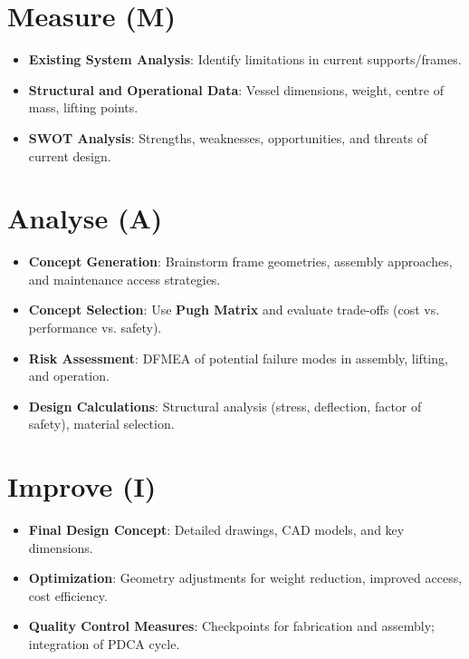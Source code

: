 \documentclass[9pt]{extarticle}
\begin{document}
\newpage

\section{Measure (M)}
\color{red!50!black}
\begin{itemize}[itemsep=-1mm]
	\item \textbf{Existing System Analysis}: Identify limitations in current supports/frames.
	\item \textbf{Structural and Operational Data}: Vessel dimensions, weight, centre of mass, lifting points.
	\item \textbf{SWOT Analysis}: Strengths, weaknesses, opportunities, and threats of current design.
\end{itemize}
\color{black}
\newpage

\section{Analyse (A)}
\color{red!50!black}
\begin{itemize}[itemsep=-1mm]
	\item \textbf{Concept Generation}: Brainstorm frame geometries, assembly approaches, and maintenance access strategies.
	\item \textbf{Concept Selection}: Use \textbf{Pugh Matrix} and evaluate trade-offs (cost vs. performance vs. safety).
	\item \textbf{Risk Assessment}: DFMEA of potential failure modes in assembly, lifting, and operation.
	\item \textbf{Design Calculations}: Structural analysis (stress, deflection, factor of safety), material selection.
\end{itemize}
\color{black}
\newpage

\section{Improve (I)}
\color{red!50!black}
\begin{itemize}[itemsep=-1mm]
	\item \textbf{Final Design Concept}: Detailed drawings, CAD models, and key dimensions.
	\item \textbf{Optimization}: Geometry adjustments for weight reduction, improved access, cost efficiency.
	\item \textbf{Quality Control Measures}: Checkpoints for fabrication and assembly; integration of PDCA cycle.
\end{itemize}
\color{black}
\end{document}
